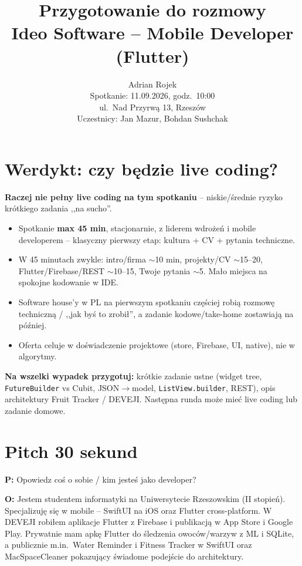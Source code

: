 \documentclass[11pt,a4paper]{article}
\title{Przygotowanie do rozmowy\\Ideo Software -- Mobile Developer (Flutter)}
\author{Adrian Rojek\\Spotkanie: 11.09.2026, godz.\ 10:00\\ul.\ Nad Przyrwą 13, Rzeszów\\Uczestnicy: Jan Mazur, Bohdan Sushchak}
\date{}
\newcommand{\pyt}[1]{\par\medskip\noindent\textbf{P:} #1\par}
\newcommand{\odp}[1]{\noindent\textbf{O:} #1\par}
\begin{document}
\maketitle
\tableofcontents
\newpage

\section{Werdykt: czy będzie live coding?}

\textbf{Raczej nie pełny live coding na tym spotkaniu} -- niskie/średnie ryzyko krótkiego zadania ,,na sucho''.

\begin{itemize}[leftmargin=*]
  \item Spotkanie \textbf{max 45 min}, stacjonarnie, z liderem wdrożeń i mobile developerem -- klasyczny pierwszy etap: kultura + CV + pytania techniczne.
  \item W 45 minutach zwykle: intro/firma $\sim$10 min, projekty/CV $\sim$15--20, Flutter/Firebase/REST $\sim$10--15, Twoje pytania $\sim$5. Mało miejsca na spokojne kodowanie w IDE.
  \item Software house'y w PL na pierwszym spotkaniu częściej robią rozmowę techniczną / ,,jak byś to zrobił'', a zadanie kodowe/take-home zostawiają na później.
  \item Oferta celuje w doświadczenie projektowe (store, Firebase, UI, native), nie w algorytmy.
\end{itemize}

\textbf{Na wszelki wypadek przygotuj:} krótkie zadanie ustne (widget tree, \texttt{FutureBuilder} vs Cubit, JSON$\to$model, \texttt{ListView.builder}, REST), opis architektury Fruit Tracker / DEVEJI. Następna runda może mieć live coding lub zadanie domowe.

\section{Pitch 30 sekund}

\pyt{Opowiedz coś o sobie / kim jesteś jako developer?}
\odp{Jestem studentem informatyki na Uniwersytecie Rzeszowskim (II stopień). Specjalizuję się w mobile -- SwiftUI na iOS oraz Flutter cross-platform. W DEVEJI robiłem aplikacje Flutter z Firebase i publikacją w App Store i Google Play. Prywatnie mam apkę Flutter do śledzenia owoców/warzyw z ML i SQLite, a publicznie m.in.\ Water Reminder i Fitness Tracker w SwiftUI oraz MacSpaceCleaner pokazujący świadome podejście do architektury.}
\end{document}
